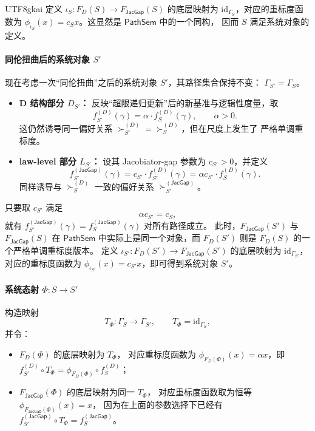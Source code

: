\documentclass[12pt]{article}
\newcommand{\JacGap}{\mathsf{JacGap}}
\begin{document}
\begin{CJK*}{UTF8}{gkai}
定义 $\iota_S:F_D(S)\to F_{\JacGap}(S)$ 的底层映射为
$\mathrm{id}_{\Gamma_S}$，对应的重标度函数为
$\phi_{\iota_S}(x)=c_S x$。这显然是 $\mathsf{PathSem}$ 中的一个同构，
因而 $S$ 满足系统对象的定义。

\paragraph{同伦扭曲后的系统对象 $S'$}

现在考虑一次“同伦扭曲”之后的系统对象 $S'$，其路径集合保持不变：
$\Gamma_{S'}=\Gamma_S$。

\begin{itemize}
  \item \textbf{D 结构部分 $D_{S'}$：}
        反映“超限递归更新”后的新基准与逻辑性度量，取
        \[
          f^{(D)}_{S'}(\gamma)
          =
          \alpha\cdot f^{(D)}_S(\gamma),
          \qquad
          \alpha>0.
        \]
        这仍然诱导同一偏好关系
        $\succ^{(D)}_{S'}=\succ^{(D)}_S$，但在尺度上发生了
        严格单调重标度。
  \item \textbf{law-level 部分 $L_{S'}$：}
        设其 Jacobiator-gap 参数为 $c_{S'}>0$，并定义
        \[
          f^{(\JacGap)}_{S'}(\gamma)
          =
          c_{S'}\cdot f^{(D)}_{S'}(\gamma)
          =
          \alpha c_{S'}\cdot f^{(D)}_S(\gamma).
        \]
        同样诱导与 $\succ^{(D)}_S$ 一致的偏好关系
        $\succ^{(\JacGap)}_{S'}$。
\end{itemize}

只要取 $c_{S'}$ 满足
\[
  \alpha c_{S'} = c_S,
\]
就有
$f^{(\JacGap)}_{S'}(\gamma)=f^{(\JacGap)}_S(\gamma)$ 对所有路径成立。
此时，$F_{\JacGap}(S')$ 与 $F_{\JacGap}(S)$ 在 $\mathsf{PathSem}$
中实际上是同一个对象，而
$F_D(S')$ 则是 $F_D(S)$ 的一个严格单调重标度版本。
定义 $\iota_{S'}:F_D(S')\to F_{\JacGap}(S')$ 的底层映射为
$\mathrm{id}_{\Gamma_{S'}}$，对应的重标度函数为
$\phi_{\iota_{S'}}(x)=c_{S'} x$，即可得到系统对象 $S'$。

\paragraph{系统态射 $\Phi:S\to S'$}

构造映射
\[
  T_\Phi:\Gamma_S\longrightarrow\Gamma_{S'},
  \qquad
  T_\Phi=\mathrm{id}_{\Gamma_S},
\]
并令：
\begin{itemize}
  \item $F_D(\Phi)$ 的底层映射为 $T_\Phi$，
        对应重标度函数为
        $\phi_{F_D(\Phi)}(x)=\alpha x$，即
        $f^{(D)}_{S'}\circ T_\Phi=\phi_{F_D(\Phi)}\circ f^{(D)}_S$；
  \item $F_{\JacGap}(\Phi)$ 的底层映射为同一 $T_\Phi$，
        对应重标度函数取为恒等
        $\phi_{F_{\JacGap}(\Phi)}(x)=x$，
        因为在上面的参数选择下已经有
        $f^{(\JacGap)}_{S'}\circ T_\Phi=f^{(\JacGap)}_S$。
\end{itemize}


\end{CJK*}
\end{document}
